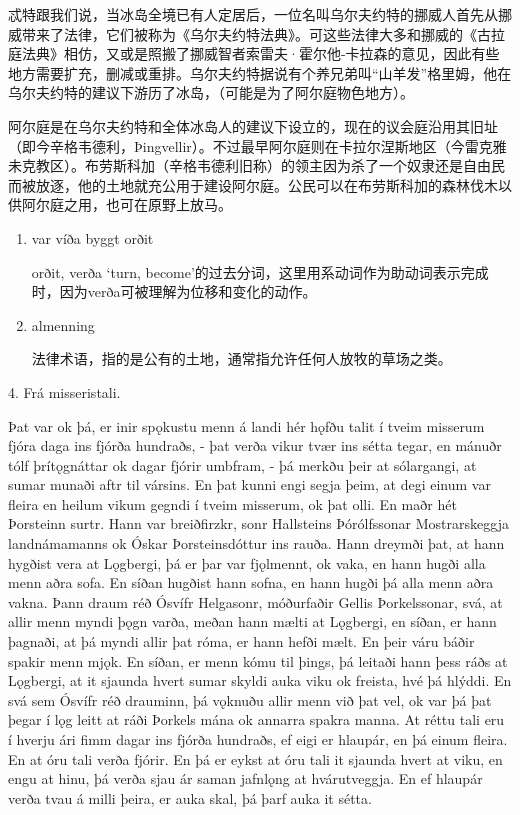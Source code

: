 \begin{translation*}{}
    忒特跟我们说，当冰岛全境已有人定居后，一位名叫乌尔夫约特的挪威人首先从挪威带来了法律，它们被称为《乌尔夫约特法典》。可这些法律大多和挪威的《古拉庭法典》相仿，又或是照搬了挪威智者索雷夫·霍尔他-卡拉森的意见，因此有些地方需要扩充，删减或重排。乌尔夫约特据说有个养兄弟叫“山羊发”格里姆，他在乌尔夫约特的建议下游历了冰岛，（可能是为了阿尔庭物色地方）。

    阿尔庭是在乌尔夫约特和全体冰岛人的建议下设立的，现在的议会庭沿用其旧址（即今辛格韦德利，Þingvellir）。不过最早阿尔庭则在卡拉尔涅斯地区（今雷克雅未克教区）。布劳斯科加（辛格韦德利旧称）的领主因为杀了一个奴隶还是自由民而被放逐，他的土地就充公用于建设阿尔庭。公民可以在布劳斯科加的森林伐木以供阿尔庭之用，也可在原野上放马。
\end{translation*}
\begin{grammar*}{}
    \begin{enumerate}
        \item var víða byggt orðit

              orðit, verða `turn, become'的过去分词，这里用系动词作为助动词表示完成时，因为verða可被理解为位移和变化的动作。
        \item almenning

              法律术语，指的是公有的土地，通常指允许任何人放牧的草场之类。
    \end{enumerate}
\end{grammar*}

4. Frá misseristali.

Þat var ok þá, er inir spǫkustu menn á landi hér hǫfðu talit í tveim misserum fjóra daga ins fjórða hundraðs, - þat verða vikur tvær ins sétta tegar, en mánuðr tólf þrítǫgnáttar ok dagar fjórir umbfram, - þá merkðu þeir at sólargangi, at sumar munaði aftr til vársins. En þat kunni engi segja þeim, at degi einum var fleira en heilum vikum gegndi í tveim misserum, ok þat olli.
En maðr hét Þorsteinn surtr. Hann var breiðfirzkr, sonr Hallsteins Þórólfssonar Mostrarskeggja landnámamanns ok Óskar Þorsteinsdóttur ins rauða. Hann dreymði þat, at hann hygðist vera at Lǫgbergi, þá er þar var fjǫlmennt, ok vaka, en hann hugði alla menn aðra sofa. En síðan hugðist hann sofna, en hann hugði þá alla menn aðra vakna. Þann draum réð Ósvífr Helgasonr, móðurfaðir Gellis Þorkelssonar, svá, at allir menn myndi þǫgn varða, meðan hann mælti at Lǫgbergi, en síðan, er hann þagnaði, at þá myndi allir þat róma, er hann hefði mælt. En þeir váru báðir spakir menn mjǫk.
En síðan, er menn kómu til þings, þá leitaði hann þess ráðs at Lǫgbergi, at it sjaunda hvert sumar skyldi auka viku ok freista, hvé þá hlýddi. En svá sem Ósvífr réð drauminn, þá vǫknuðu allir menn við þat vel, ok var þá þat þegar í lǫg leitt at ráði Þorkels mána ok annarra spakra manna.
At réttu tali eru í hverju ári fimm dagar ins fjórða hundraðs, ef eigi er hlaupár, en þá einum fleira. En at óru tali verða fjórir. En þá er eykst at óru tali it sjaunda hvert at viku, en engu at hinu, þá verða sjau ár saman jafnlǫng at hvárutveggja. En ef hlaupár verða tvau á milli þeira, er auka skal, þá þarf auka it sétta.


